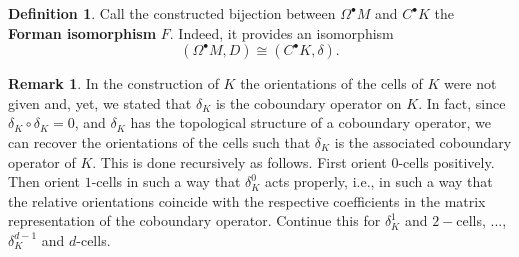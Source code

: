 \documentclass{elsarticle}
\theoremstyle{definition}
\newtheorem{definition}[theorem]{Definition}
\newtheorem{remark}[theorem]{Remark}
\begin{document}
\begin{definition}
  Call the constructed bijection between $\Omega^{\bullet} M$ and $C^{\bullet} K$ the \textbf{Forman isomorphism} $F$. Indeed, it provides an isomorphism
  \begin{equation*}
    (\Omega^{\bullet} M, D) \cong (C^{\bullet} K, \delta).
  \end{equation*}
\end{definition}
\begin{remark}
  In the construction of $K$ the orientations of the cells of $K$ were not given and, yet, we stated that $\delta_K$ is the coboundary operator on $K$. In fact, since $\delta_K \circ \delta_K = 0$, and $\delta_K$ has the topological structure of a coboundary operator, we can recover the  orientations of the cells such that $\delta_K$ is the associated coboundary operator of $K$. This is done recursively as follows. First orient $0$-cells positively. Then orient $1$-cells in such a way that $\delta_K^0$ acts properly, i.e., in such a way that the relative orientations coincide with the respective coefficients in the matrix representation of the coboundary operator. Continue this for $\delta_K^1$ and $2-$cells, ..., $\delta_K^{d - 1}$ and $d$-cells. 
\end{remark}
\end{document}
